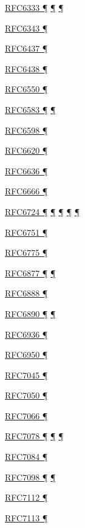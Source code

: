 \documentclass[
]{article}
\begin{document}
\hyperref[dual-stack-scenarios]{RFC6333 ¶}
\hyperref[translation-and-ipv4-as-a-service]{¶} \hyperref[tunnels]{¶}

\hyperref[obsolete-techniques]{RFC6343 ¶}

\hyperref[traffic-class-and-flow-label]{RFC6437 ¶}

\hyperref[traffic-class-and-flow-label]{RFC6438 ¶}

\hyperref[routing]{RFC6550 ¶}

\hyperref[address-resolution]{RFC6583 ¶}
\hyperref[layer-2-considerations]{¶}

\hyperref[address-planning]{RFC6598 ¶}

\hyperref[layer-2-considerations]{RFC6620 ¶}

\hyperref[address-resolution]{RFC6636 ¶}

\hyperref[filtering]{RFC6666 ¶}

\hyperref[how-an-application-programmer-sees-ipv6]{RFC6724 ¶}
\hyperref[obsolete-features-in-ipv6]{¶} \hyperref[dns]{¶}
\hyperref[source-and-destination-address-selection]{¶}
\hyperref[multi-prefix-operation]{¶}

\hyperref[obsolete-techniques]{RFC6751 ¶}

\hyperref[address-resolution]{RFC6775 ¶}

\hyperref[dual-stack-scenarios]{RFC6877 ¶}
\hyperref[translation-and-ipv4-as-a-service]{¶}

\hyperref[dual-stack-scenarios]{RFC6888 ¶}

\hyperref[addresses]{RFC6890 ¶} \hyperref[filtering]{¶}

\hyperref[transport-protocols]{RFC6936 ¶}

\hyperref[multi-prefix-operation]{RFC6950 ¶}

\hyperref[filtering]{RFC7045 ¶}

\hyperref[obsolete-techniques]{RFC7050 ¶}

\hyperref[managed-configuration]{RFC7066 ¶}

\hyperref[dns]{RFC7078 ¶}
\hyperref[source-and-destination-address-selection]{¶}
\hyperref[multi-prefix-operation]{¶}

\hyperref[routing]{RFC7084 ¶}

\hyperref[traffic-class-and-flow-label]{RFC7098 ¶}
\hyperref[topology-obfuscation]{¶}

\hyperref[layer-2-considerations]{RFC7112 ¶}

\hyperref[layer-2-considerations]{RFC7113 ¶}
\end{document}
